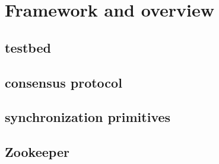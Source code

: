 \section{Framework and overview}\label{sec:framework}

\subsection{testbed}

\subsection{consensus protocol}

\subsection{synchronization primitives}


\subsection{Zookeeper}


